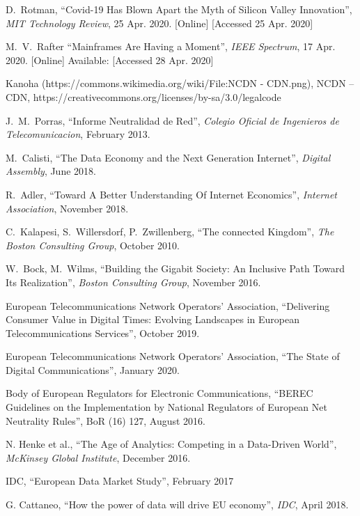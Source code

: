 \documentclass[journal]{IEEEtran}
\begin{document}
\begin{thebibliography}{6}
 D.~Rotman, \enquote{Covid-19 Has Blown Apart the Myth of Silicon Valley Innovation}, \emph{MIT Technology Review}, 25 Apr. 2020. [Online] [Accessed 25 Apr. 2020]

 M.~V.~Rafter \enquote{Mainframes Are Having a Moment}, \emph{IEEE Spectrum}, 17 Apr. 2020. [Online] Available: [Accessed 28 Apr. 2020]

 Kanoha (https://commons.wikimedia.org/wiki/File:NCDN - CDN.png), NCDN -- CDN, https://creativecommons.org/licenses/by-sa/3.0/legalcode

 J.~M.~Porras, \enquote{Informe Neutralidad de Red}, \emph{Colegio Oficial de Ingenieros de Telecomunicacion}, February 2013.

 M.~Calisti, \enquote{The Data Economy and the Next Generation Internet}, \emph{Digital Assembly}, June 2018.

R.~Adler, \enquote{Toward A Better Understanding Of Internet Economics}, \emph{Internet Association}, November 2018.

C.~Kalapesi, S.~Willersdorf, P.~Zwillenberg, \enquote{The connected Kingdom}, \emph{The Boston Consulting Group}, October 2010.

W.~Bock, M.~Wilms, \enquote{Building the Gigabit Society: An Inclusive Path Toward Its Realization}, \emph{Boston Consulting Group}, November 2016.

European Telecommunications Network Operators' Association, \enquote{Delivering Consumer Value in Digital Times: Evolving Landscapes in European Telecommunications Services}, October 2019.

European Telecommunications Network Operators' Association, \enquote{The State of Digital Communications}, January 2020.

Body of European Regulators for Electronic Communications, \enquote{BEREC Guidelines on the Implementation by National Regulators of European Net Neutrality Rules}, BoR (16) 127, August 2016.

N. Henke et al., \enquote{The Age of Analytics: Competing in a Data-Driven World}, \emph{McKinsey Global Institute}, December 2016.

IDC, \enquote{European Data Market Study}, February 2017

G. Cattaneo, \enquote{How the power of data will drive EU economy}, \emph{IDC}, April 2018.


\end{thebibliography}
\end{document}
